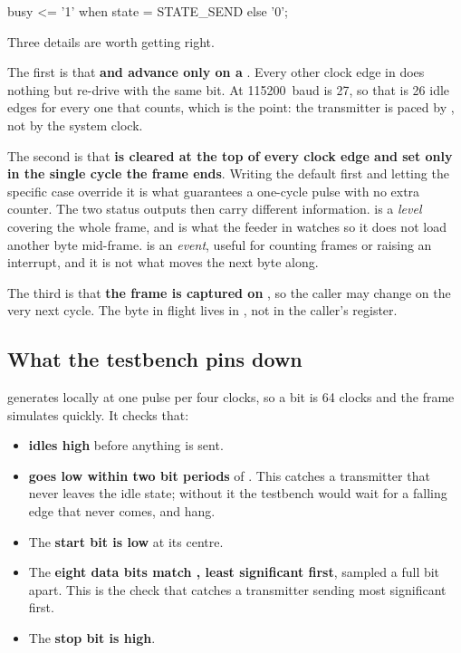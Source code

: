 \begin{vhdlcode}
busy <= '1' when state = STATE_SEND else '0';
\end{vhdlcode}

\noindent Three details are worth getting right.

The first is that \textbf{ and  advance only on a }.
Every other clock edge in  does nothing but re-drive  with the same bit.
At 115200~baud  is 27, so that is 26 idle edges for every one that counts, which is
the point: the transmitter is paced by , not by the system clock.

The second is that \textbf{ is cleared at the top of every clock edge and set only in
the single cycle the frame ends}. Writing the default first and letting the specific case override
it is what guarantees a one-cycle pulse with no extra counter. The two status outputs then carry
different information.  is a \emph{level} covering the whole frame, and is what the
feeder in  watches so it does not load another byte mid-frame.  is an
\emph{event}, useful for counting frames or raising an interrupt, and it is not what moves the next
byte along.

The third is that \textbf{the frame is captured on }, so the caller may change
 on the very next cycle. The byte in flight lives in , not in the caller's
register.

\subsection{What the testbench pins down}
\label{c2:sec:uart_tx_tb}
 generates  locally at one pulse per four clocks, so a bit is 64
clocks and the frame simulates quickly. It checks that:
\begin{itemize}
  \item {} \textbf{idles high} before anything is sent.
  \item {} \textbf{goes low within two bit periods} of . This catches a
    transmitter that never leaves the idle state; without it the testbench would wait for a falling
    edge that never comes, and hang.
  \item The \textbf{start bit is low} at its centre.
  \item The \textbf{eight data bits match , least significant first}, sampled a full bit
    apart. This is the check that catches a transmitter sending most significant first.
  \item The \textbf{stop bit is high}.
\end{itemize}

